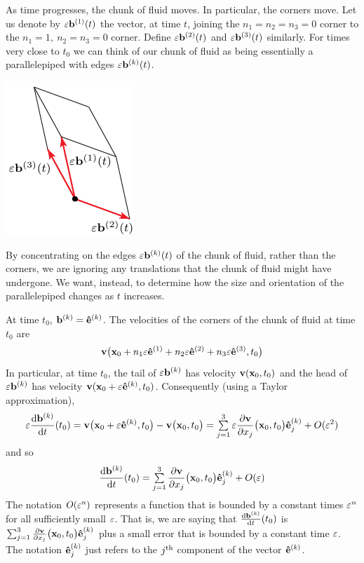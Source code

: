 As time progresses, 
the chunk of fluid moves. In particular, the corners move. Let us denote by 
$\varepsilon\mathbf{b}^{(1)}(t)$ the vector, at time $t$,
joining the $n_1=n_2=n_3=0$ corner to the $n_1=1,\
n_2=n_3=0$ corner. Define $\varepsilon\mathbf{b}^{(2)}(t)$ and $\varepsilon\mathbf{b}^{(3)}(t)$ similarly.
For times very close to $t_0$ we can think of our chunk of fluid as being
essentially a parallelepiped with edges $\varepsilon\mathbf{b}^{(k)}(t)$. 
\begin{nfig}
\begin{center}
    \includegraphics{cubeB.pdf}
\end{center}
\end{nfig}
By concentrating on the edges $\varepsilon\mathbf{b}^{(k)}(t)$ of the chunk of fluid, rather
than the corners, we are ignoring any translations that the chunk of
fluid might have undergone. We want, instead, to determine
how the size and orientation of the parallelepiped changes  as $t$ increases.

At time $t_0$, $\mathbf{b}^{(k)}=\mathbf{\hat e}^{(k)}$.
The velocities  of the corners of the chunk of fluid at time $t_0$ are 
\begin{equation*}
\mathbf{v}\big(\mathbf{x}_0+n_1\varepsilon\mathbf{\hat e}^{(1)}+n_2\varepsilon\mathbf{\hat e}^{(2)}+n_3\varepsilon\mathbf{\hat e}^{(3)},t_0\big)
\end{equation*}
In particular, at time $t_0$, the tail of $\varepsilon\mathbf{b}^{(k)}$ has velocity 
$\mathbf{v}(\mathbf{x}_0,t_0)$ and the head of $\varepsilon\mathbf{b}^{(k)}$ has velocity 
$\mathbf{v}(\mathbf{x}_0+\varepsilon\mathbf{\hat e}^{(k)},t_0)$. Consequently (using a Taylor approximation), 
\begin{equation*}
\veps\diff{\vb^{(k)}}{t}(t_0)=\vv\big(\vx_0+\veps\ha{k},t_0\big)
      -\vv\big(\vx_0,t_0\big)
=\smsum_{j=1}^3\veps\frac{\partial\vv}{\partial x_j}\big(\vx_0,t_0\big)\ha{k}_j
+O(\veps^2)
\end{equation*}
and so
\begin{equation*}
\diff{\vb^{(k)}}{t}(t_0)
=\smsum_{j=1}^3\frac{\partial\vv}{\partial x_j}\big(\vx_0,t_0\big)\ha{k}_j
+O(\veps)
\end{equation*}
The notation $O(\varepsilon^n)$ represents a function that is bounded by a constant
times $\varepsilon^n$ for all sufficiently small $\varepsilon$. That is, we are saying that
$\diff{\vb^{(k)}}{t}(t_0)$ is 
$\mathop{{\textstyle \sum}}_{j=1}^3\frac{\partial\mathbf{v}}{\partial x_j}\big(\mathbf{x}_0,t_0\big)\mathbf{\hat e}^{(k)}_j$
plus a small error that is bounded by a constant time $\varepsilon$.
The notation $\mathbf{\hat e}^{(k)}_j$
just refers to the $j^{\rm th}$ component of the vector $\mathbf{\hat e}^{(k)}$.

